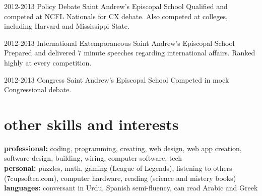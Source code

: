 \documentclass[]{friggeri-cv} %
\begin{document}
\begin{entrylist}


\entry
{2012-2013}
{Policy Debate}
{Saint Andrew's Episcopal School}
{Qualified and competed at NCFL Nationals for CX debate. Also competed at colleges, including Harvard and Mississippi State.}


\entry
{2012-2013}
{International Extemporaneous}
{Saint Andrew's Episcopal School}
{Prepared and delivered 7 minute speeches regarding international affairs. Ranked highly at every competition.}


\entry
{2012-2013}
{Congress}
{Saint Andrew's Episcopal School}
{Competed in mock Congressional debate.}


\end{entrylist}


\section{other skills and interests}

\textbf{professional:} coding, programming, creating, web design, web app creation, software design, building, wiring, computer software, tech 
\\ 
\textbf{personal:} puzzles, math, gaming (League of Legends), listening to others (7cupsoftea.com), computer hardware, reading (science and mistery books)   \\ 
\textbf{languages:} conversant in Urdu, Spanish semi-fluency, can read Arabic and Greek
\end{document}
